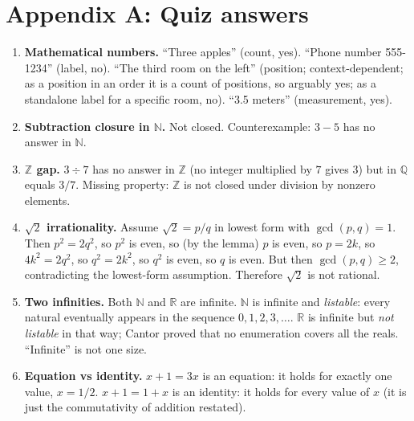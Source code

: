 \newpage


\section*{Appendix A: Quiz answers}

\begin{enumerate}
  \item \textbf{Mathematical numbers.} ``Three apples'' (count, yes). ``Phone number 555-1234'' (label, no). ``The third room on the left'' (position; context-dependent; as a position in an order it is a count of positions, so arguably yes; as a standalone label for a specific room, no). ``3.5 meters'' (measurement, yes).

  \item \textbf{Subtraction closure in $\mathbb{N}$.} Not closed. Counterexample: $3 - 5$ has no answer in $\mathbb{N}$.

  \item \textbf{$\mathbb{Z}$ gap.} $3 \div 7$ has no answer in $\mathbb{Z}$ (no integer multiplied by $7$ gives $3$) but in $\mathbb{Q}$ equals $3/7$. Missing property: $\mathbb{Z}$ is not closed under division by nonzero elements.

  \item \textbf{$\sqrt{2}$ irrationality.} Assume $\sqrt{2} = p/q$ in lowest form with $\gcd(p, q) = 1$. Then $p^2 = 2q^2$, so $p^2$ is even, so (by the lemma) $p$ is even, so $p = 2k$, so $4k^2 = 2q^2$, so $q^2 = 2k^2$, so $q^2$ is even, so $q$ is even. But then $\gcd(p, q) \geq 2$, contradicting the lowest-form assumption. Therefore $\sqrt{2}$ is not rational.

  \item \textbf{Two infinities.} Both $\mathbb{N}$ and $\mathbb{R}$ are infinite. $\mathbb{N}$ is infinite and \emph{listable}: every natural eventually appears in the sequence $0, 1, 2, 3, \ldots$. $\mathbb{R}$ is infinite but \emph{not listable} in that way; Cantor proved that no enumeration covers all the reals. ``Infinite'' is not one size.

  \item \textbf{Equation vs identity.} $x + 1 = 3x$ is an equation: it holds for exactly one value, $x = 1/2$. $x + 1 = 1 + x$ is an identity: it holds for every value of $x$ (it is just the commutativity of addition restated).


\end{enumerate}
